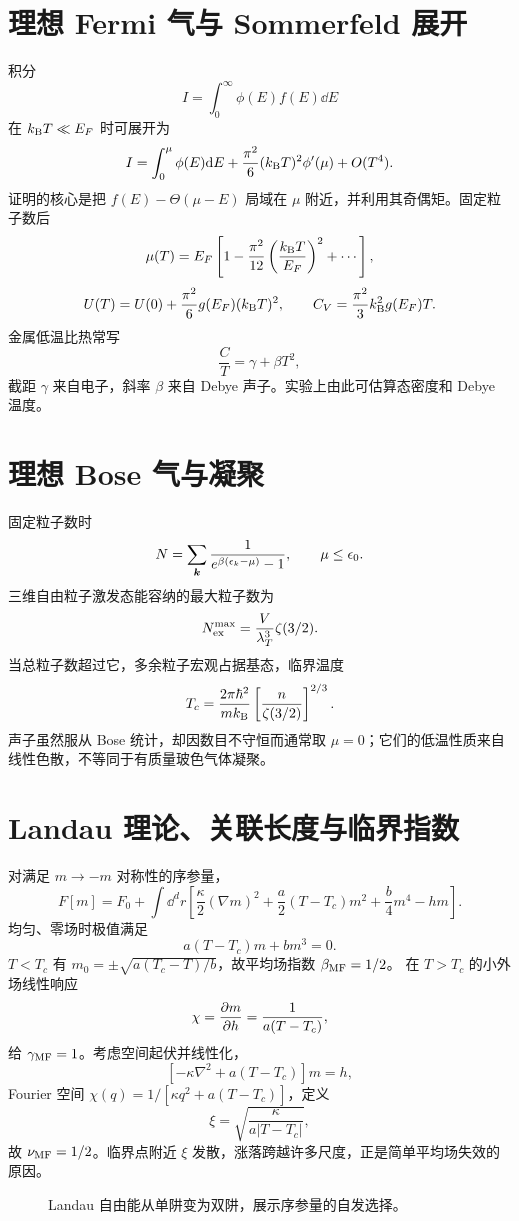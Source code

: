 \section{理想 Fermi 气与 Sommerfeld 展开}
积分
\[
I=\int_0^\infty\phi(E)f(E)\dd E
\]
在 $k_{\mathrm B} T\ll E_F$ 时可展开为
\[
I=\int_0^\mu\phi(E)\mathrm d E
+\frac{\pi^2}{6}(k_{\mathrm B} T)^2\phi'(\mu)+O(T^4).
\]
证明的核心是把 $f(E)-\Theta(\mu-E)$ 局域在 $\mu$ 附近，并利用其奇偶矩。固定粒子数后
\[
\mu(T)=E_F\left[1-\frac{\pi^2}{12}
\left(\frac{k_{\mathrm B} T}{E_F}\right)^2+\cdots\right],
\]
\[
U(T)=U(0)+\frac{\pi^2}{6}g(E_F)(k_{\mathrm B} T)^2,
\qquad C_V=\frac{\pi^2}{3}k_{\mathrm B}^2g(E_F)T.
\]
金属低温比热常写
\[
\frac CT=\gamma+\beta T^2,
\]
截距 $\gamma$ 来自电子，斜率 $\beta$ 来自 Debye 声子。实验上由此可估算态密度和 Debye 温度。

\section{理想 Bose 气与凝聚}
固定粒子数时
\[
N=\sum_{\bm{k}}\frac1{e^{\beta(\epsilon_k-\mu)}-1},
\qquad \mu\le\epsilon_0.
\]
三维自由粒子激发态能容纳的最大粒子数为
\[
N_{\rm ex}^{\max}
=\frac{V}{\lambda_T^3}\zeta(3/2).
\]
当总粒子数超过它，多余粒子宏观占据基态，临界温度
\[
T_c=\frac{2\pi\hbar^2}{mk_{\mathrm B}}
\left[\frac{n}{\zeta(3/2)}\right]^{2/3}.
\]
声子虽然服从 Bose 统计，却因数目不守恒而通常取 $\mu=0$；它们的低温性质来自线性色散，不等同于有质量玻色气体凝聚。

\section{Landau 理论、关联长度与临界指数}
对满足 $m\to-m$ 对称性的序参量，
\[
F[m]=F_0+\int\dd^dr\left[
\frac\kappa2(\nabla m)^2+\frac a2(T-T_c)m^2+\frac b4m^4-hm
\right].
\]
均匀、零场时极值满足
\[
a(T-T_c)m+bm^3=0.
\]
$T<T_c$ 有
$m_0=\pm\sqrt{a(T_c-T)/b}$，故平均场指数 $\beta_{\rm MF}=1/2$。
在 $T>T_c$ 的小外场线性响应
\[
\chi=\frac{\partial m}{\partial h}=\frac1{a(T-T_c)},
\]
给 $\gamma_{\rm MF}=1$。考虑空间起伏并线性化，
\[
[-\kappa\nabla^2+a(T-T_c)]m=h,
\]
Fourier 空间
$\chi(q)=1/[\kappa q^2+a(T-T_c)]$，定义
\[
\xi=\sqrt{\frac{\kappa}{a|T-T_c|}},
\]
故 $\nu_{\rm MF}=1/2$。临界点附近 $\xi$ 发散，涨落跨越许多尺度，正是简单平均场失效的原因。

\begin{figure}[htbp]
\centering
{}
\caption{Landau 自由能从单阱变为双阱，展示序参量的自发选择。}
\end{figure}

